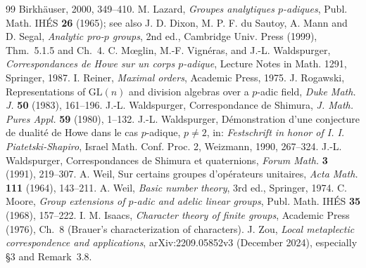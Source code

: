 \documentclass[11pt]{article}
\theoremstyle{plain}
\theoremstyle{definition}
\begin{document}
\begin{thebibliography}{99}
Birkh\"auser, 2000, 349--410.
 M. Lazard, \emph{Groupes analytiques $p$-adiques},
Publ. Math. IH\'ES \textbf{26} (1965); see also J. D. Dixon, M. P. F. du
Sautoy, A. Mann and D. Segal, \emph{Analytic pro-$p$ groups}, 2nd ed.,
Cambridge Univ. Press (1999), Thm.~5.1.5 and Ch.~4.
 C. M\oe glin, M.-F. Vign\'eras, and J.-L. Waldspurger,
\emph{Correspondances de Howe sur un corps $p$-adique}, Lecture Notes
in Math. 1291, Springer, 1987.
 I. Reiner, \emph{Maximal orders}, Academic Press, 1975.
 J. Rogawski, Representations of $\mathrm{GL}(n)$ and
division algebras over a $p$-adic field, \emph{Duke Math. J.} \textbf{50}
(1983), 161--196.
 J.-L. Waldspurger, Correspondance de Shimura, \emph{J.
Math. Pures Appl.} \textbf{59} (1980), 1--132.
 J.-L. Waldspurger, D\'emonstration d'une conjecture de
dualit\'e de Howe dans le cas $p$-adique, $p\ne2$, in: \emph{Festschrift
in honor of I. I. Piatetski-Shapiro}, Israel Math. Conf. Proc. 2,
Weizmann, 1990, 267--324.
 J.-L. Waldspurger, Correspondances de Shimura et
quaternions, \emph{Forum Math.} \textbf{3} (1991), 219--307.
 A. Weil, Sur certains groupes d'op\'erateurs unitaires,
\emph{Acta Math.} \textbf{111} (1964), 143--211.
 A. Weil, \emph{Basic number theory}, 3rd ed., Springer, 1974.
 C. Moore, \emph{Group extensions of $p$-adic and adelic
linear groups}, Publ. Math. IH\'ES \textbf{35} (1968), 157--222.
 I. M. Isaacs, \emph{Character theory of finite groups},
Academic Press (1976), Ch.~8 (Brauer's characterization of characters).
 J. Zou,
\emph{Local metaplectic correspondence and applications},
arXiv:2209.05852v3 (December 2024), especially \S3 and Remark~3.8.
\end{thebibliography}
\end{document}

